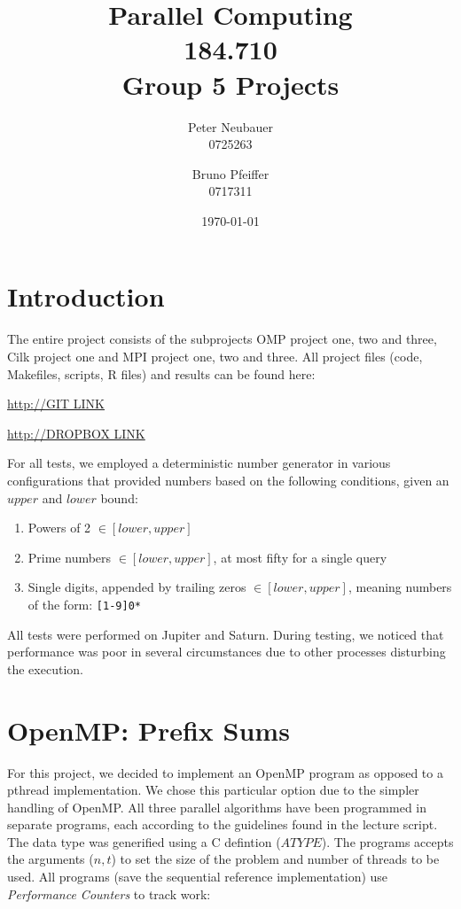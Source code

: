 \documentclass[11pt]{article}
\begin{document}
\title{Parallel Computing\\184.710\\Group 5 Projects}
\author{Peter Neubauer\\ 0725263 \and Bruno Pfeiffer \\ 0717311}
\date{\today}
\maketitle
\newpage
\tableofcontents

\newpage
\section{Introduction}

The entire project consists of the subprojects OMP project one, two and three, Cilk project one and MPI project one, two and three. All project files (code, Makefiles, scripts, R files) and results can be found here:

\begin{center}
\url{http://GIT LINK}

\url{http://DROPBOX LINK}
\end{center}

For all tests, we employed a deterministic number generator in various configurations that provided numbers based on the following conditions, given an $upper$ and $lower$ bound:
\begin{enumerate}
\item Powers of 2 $ \in [lower, upper]$
\item Prime numbers $\in [lower, upper]$, at most fifty for a single query
\item Single digits, appended by trailing zeros $\in [lower, upper]$, meaning numbers of the form: \verb=[1-9]0*=
\end{enumerate}
All tests were performed on Jupiter and Saturn. During testing, we noticed that performance was poor in several circumstances due to other processes disturbing the execution.


\section{OpenMP: Prefix Sums}
For this project, we decided to implement an OpenMP program as opposed to a pthread implementation. We chose this particular option due to the simpler handling of OpenMP. All three parallel algorithms have been programmed in separate programs, each according to the guidelines found in the lecture script. The data type was generified using a C defintion ($ATYPE$). The programs accepts the arguments ($n, t$) to set the size of the problem and number of threads to be used.
All programs (save the sequential reference implementation) use \emph{Performance Counters} to track work:
\end{document}
